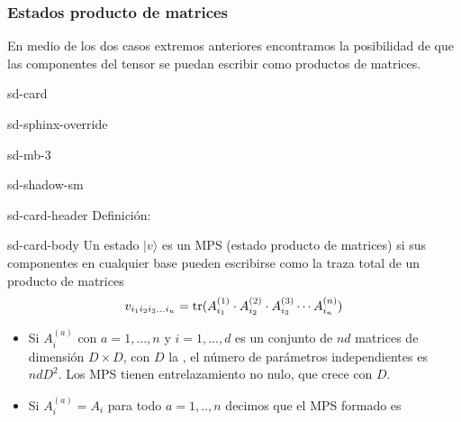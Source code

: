 \documentclass[letterpaper,10pt,english]{jupyterBook}
\newcommand{\ket}[1]{|#1\rangle}
\newcommand{\tr}{{\rm tr}}
\begin{document}
\subsubsection{Estados producto de matrices }
\label{\detokenize{docs/Part_01_Formalismo/Chapter_01_02_Formalismo_matem_xe1tico/01_04_Tensores_myst:estados-producto-de-matrices-mps}}
\sphinxAtStartPar
En medio de los dos casos extremos anteriores encontramos la posibilidad de que las componentes del tensor se puedan escribir como productos de matrices.

\begin{sphinxuseclass}{sd-card}
\begin{sphinxuseclass}{sd-sphinx-override}
\begin{sphinxuseclass}{sd-mb-3}
\begin{sphinxuseclass}{sd-shadow-sm}
\begin{sphinxuseclass}{sd-card-header}
\sphinxAtStartPar
Definición:

\end{sphinxuseclass}
\begin{sphinxuseclass}{sd-card-body}
\sphinxAtStartPar
Un estado \(\ket{v}\) es un MPS (estado producto de matrices) si sus componentes en cualquier base pueden escribirse como la traza total de un producto de matrices
\begin{equation*}
\begin{split}
v_{i_1 i_2 i_3... i_n} =\tr ( A^{(1)}_{i_1}\cdot A^{(2)}_{i_2}\cdot A^{(3)}_{i_3} \cdots A^{(n)}_{i_n} )
\end{split}
\end{equation*}
\end{sphinxuseclass}
\end{sphinxuseclass}
\end{sphinxuseclass}
\end{sphinxuseclass}
\end{sphinxuseclass}\begin{itemize}
\item {} 
\sphinxAtStartPar
Si \(A^{(a)}_i\) con \(a=1,...,n\) y \(i=1,...,d\) es un conjunto  de \(nd\) matrices de dimensión \(D\times D\), con \(D\) la  , el número de parámetros independientes es \(ndD^2\).
Los MPS tienen entrelazamiento no nulo, que crece con \(D\).

\end{itemize}
\begin{itemize}
\item {} 
\sphinxAtStartPar
Si \(A^{(a)}_i = A_i\) para todo \(a=1,..,n\) decimos que el MPS formado es 

\end{itemize}
\end{document}
